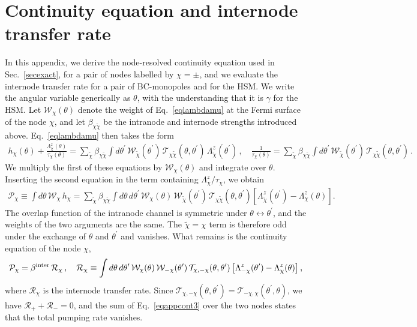 \documentclass[aps,prb,onecolumn,nofootinbib,citeautoscript,10pt]{revtex4-2}
\begin{document}
\section{\texorpdfstring{Continuity equation and internode transfer rate}{Continuity equation and internode transfer rate}}
\label{appcont}

In this appendix, we derive the node-resolved continuity equation used in Sec.~\ref{secexact}, for a pair of nodes labelled by $\chi=\pm$, and we evaluate the internode transfer rate for a pair of BC-monopoles and for the HSM. We write the angular variable generically as $\theta$, with the understanding that it is $\gamma$ for the HSM. Let $\mathcal W_\chi(\theta)$ denote the weight of Eq.~\eqref{eqlambdamu} at the Fermi surface of the node $\chi$, and let $\beta_{\chi\tilde\chi}$ be the intranode and internode strengths introduced above. Eq.~\eqref{eqlambdamu} then takes the form
\begin{align}
\label{eqappcont1}
h_\chi(\theta) + \frac{\Lambda^z_\chi(\theta)}{\tau_\chi(\theta)}
= \sum_{\tilde\chi}\beta_{\chi\tilde\chi}\int d\theta^\prime\,\mathcal W_{\tilde\chi}(\theta^\prime)\,\mathcal T_{\chi\tilde\chi}(\theta,\theta^\prime)\,\Lambda^z_{\tilde\chi}(\theta^\prime) \,, \quad
\frac{1}{\tau_\chi(\theta)}
= \sum_{\tilde\chi}\beta_{\chi\tilde\chi}\int d\theta^\prime\,\mathcal W_{\tilde\chi}(\theta^\prime)\,\mathcal T_{\chi\tilde\chi}(\theta,\theta^\prime)\,.
\end{align}
We multiply the first of these equations by $\mathcal W_\chi(\theta)$ and integrate over $\theta$. Inserting the second equation in the term containing $\Lambda^z_\chi/\tau_\chi$, we obtain
\begin{align}
\label{eqappcont2}
\mathcal P_\chi \equiv \int d\theta\,\mathcal W_\chi\,h_\chi
= \sum_{\tilde\chi}\beta_{\chi\tilde\chi}\int d\theta\,d\theta^\prime\,\mathcal W_\chi(\theta)\,\mathcal W_{\tilde\chi}(\theta^\prime)\,\mathcal T_{\chi\tilde\chi}(\theta,\theta^\prime)\left[\Lambda^z_{\tilde\chi}(\theta^\prime)-\Lambda^z_\chi(\theta)\right] .
\end{align}
The overlap function of the intranode channel is symmetric under $\theta\leftrightarrow\theta^\prime$, and the weights of the two arguments are the same. The $\tilde\chi=\chi$ term is therefore odd under the exchange of $\theta$ and $\theta^\prime$ and vanishes. What remains is the continuity equation of the node $\chi$,
\begin{align}
\label{eqappcont3}
\mathcal P_\chi = \beta^{\rm inter}\,\mathcal R_\chi \,, \quad
\mathcal R_\chi \equiv \int d\theta\,d\theta^\prime\,\mathcal W_\chi(\theta)\,\mathcal W_{-\chi}(\theta^\prime)\,\mathcal T_{\chi,-\chi}(\theta,\theta^\prime)\left[\Lambda^z_{-\chi}(\theta^\prime)-\Lambda^z_\chi(\theta)\right] ,
\end{align}
where $\mathcal R_\chi$ is the internode transfer rate. Since $\mathcal T_{\chi,-\chi}(\theta,\theta^\prime)=\mathcal T_{-\chi,\chi}(\theta^\prime,\theta)$, we have $\mathcal R_++\mathcal R_-=0$, and the sum of Eq.~\eqref{eqappcont3} over the two nodes states that the total pumping rate vanishes.
\end{document}
